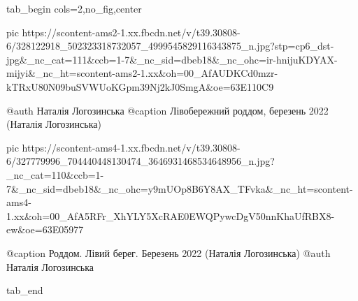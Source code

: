  
 
 
 
 

\begin{center}
\begin{minipage}{\textwidth}

\ifcmt
  tab_begin cols=2,no_fig,center

     pic https://scontent-ams2-1.xx.fbcdn.net/v/t39.30808-6/328122918_502323318732057_4999545829116343875_n.jpg?stp=cp6_dst-jpg&_nc_cat=111&ccb=1-7&_nc_sid=dbeb18&_nc_ohc=ir-hnijuKDYAX-mijyi&_nc_ht=scontent-ams2-1.xx&oh=00_AfAUDKCd0mzr-kTRxU80N09buSVWUoKGpm39Nj2kJ0SmgA&oe=63E110C9

     @auth Наталія Логозинська
     @caption Лівобережний роддом, березень 2022 (Наталія Логозинська)

     pic https://scontent-ams4-1.xx.fbcdn.net/v/t39.30808-6/327779996_704440448130474_3646931468534648956_n.jpg?_nc_cat=110&ccb=1-7&_nc_sid=dbeb18&_nc_ohc=y9mUOp8B6Y8AX_TFvka&_nc_ht=scontent-ams4-1.xx&oh=00_AfA5RFr_XhYLY5XcRAE0EWQPywcDgV50nnKhaUfRBX8-ew&oe=63E05977

     @caption Роддом. Лівий берег. Березень 2022 (Наталія Логозинська)
     @auth Наталія Логозинська

  tab_end
\fi
\end{minipage}
\end{center}
